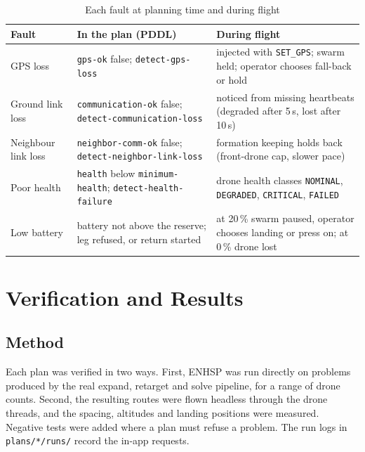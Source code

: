 \documentclass[11pt,a4paper,oneside]{report}
\newcommand{\code}[1]{\texttt{#1}}
\begin{document}
\begin{table}[H]
\caption{Each fault at planning time and during flight}\label{tab:faultmap}
\small
\begin{tabularx}{\textwidth}{@{}P{0.17\textwidth}P{0.34\textwidth}Y@{}}
\toprule
\textbf{Fault} & \textbf{In the plan (PDDL)} & \textbf{During flight} \\
\midrule
GPS loss & \code{gps-ok} false; \code{detect-gps-loss} & injected with \code{SET\_GPS}; swarm
held; operator chooses fall-back or hold \\
Ground link loss & \code{communication-ok} false; \code{detect-communication-loss} & noticed from
missing heartbeats (degraded after 5\,s, lost after 10\,s) \\
Neighbour link loss & \code{neighbor-comm-ok} false; \code{detect-neighbor-link-loss} & formation
keeping holds back (front-drone cap, slower pace) \\
Poor health & \code{health} below \code{minimum-health}; \code{detect-health-failure} & drone
health classes \code{NOMINAL}, \code{DEGRADED}, \code{CRITICAL}, \code{FAILED} \\
Low battery & battery not above the reserve; leg refused, or return started & at 20\,\% swarm
paused, operator chooses landing or press on; at 0\,\% drone lost \\
\bottomrule
\end{tabularx}
\end{table}

\chapter{Verification and Results}\label{ch:results}

\section{Method}
Each plan was verified in two ways. First, ENHSP was run directly on problems produced by the real
expand, retarget and solve pipeline, for a range of drone counts. Second, the resulting routes were
flown headless through the drone threads, and the spacing, altitudes and landing positions were
measured. Negative tests were added where a plan must refuse a problem. The run logs in
\code{plans/*/runs/} record the in-app requests.
\end{document}
